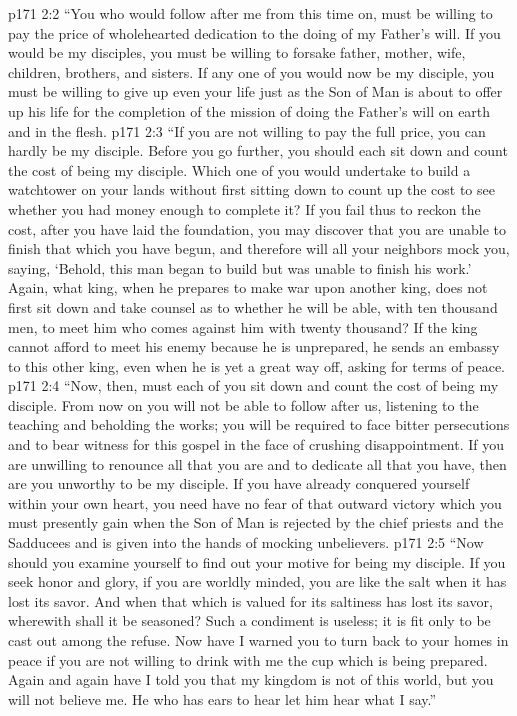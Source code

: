 \vs p171 2:2 \pc \textcolor{ubdarkred}{“You who would follow after me from this time on, must be willing to pay the price of wholehearted dedication to the doing of my Father’s will. If you would be my disciples, you must be willing to forsake father, mother, wife, children, brothers, and sisters. If any one of you would now be my disciple, you must be willing to give up even your life just as the Son of Man is about to offer up his life for the completion of the mission of doing the Father’s will on earth and in the flesh.}
\vs p171 2:3 \textcolor{ubdarkred}{“If you are not willing to pay the full price, you can hardly be my disciple. Before you go further, you should each sit down and count the cost of being my disciple. Which one of you would undertake to build a watchtower on your lands without first sitting down to count up the cost to see whether you had money enough to complete it? If you fail thus to reckon the cost, after you have laid the foundation, you may discover that you are unable to finish that which you have begun, and therefore will all your neighbors mock you, saying, ‘Behold, this man began to build but was unable to finish his work.’ Again, what king, when he prepares to make war upon another king, does not first sit down and take counsel as to whether he will be able, with ten thousand men, to meet him who comes against him with twenty thousand? If the king cannot afford to meet his enemy because he is unprepared, he sends an embassy to this other king, even when he is yet a great way off, asking for terms of peace.}
\vs p171 2:4 \textcolor{ubdarkred}{“Now, then, must each of you sit down and count the cost of being my disciple. From now on you will not be able to follow after us, listening to the teaching and beholding the works; you will be required to face bitter persecutions and to bear witness for this gospel in the face of crushing disappointment. If you are unwilling to renounce all that you are and to dedicate all that you have, then are you unworthy to be my disciple. If you have already conquered yourself within your own heart, you need have no fear of that outward victory which you must presently gain when the Son of Man is rejected by the chief priests and the Sadducees and is given into the hands of mocking unbelievers.}
\vs p171 2:5 \textcolor{ubdarkred}{“Now should you examine yourself to find out your motive for being my disciple. If you seek honor and glory, if you are worldly minded, you are like the salt when it has lost its savor. And when that which is valued for its saltiness has lost its savor, wherewith shall it be seasoned? Such a condiment is useless; it is fit only to be cast out among the refuse. Now have I warned you to turn back to your homes in peace if you are not willing to drink with me the cup which is being prepared. Again and again have I told you that my kingdom is not of this world, but you will not believe me. He who has ears to hear let him hear what I say.”}
